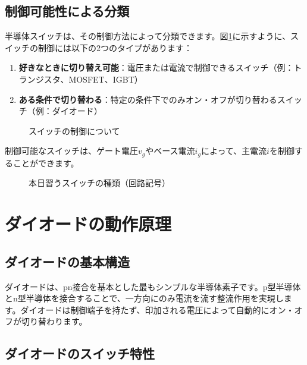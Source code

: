 \subsection{制御可能性による分類}

半導体スイッチは、その制御方法によって分類できます。図\ref{fig:control}に示すように、スイッチの制御には以下の2つのタイプがあります：

\begin{enumerate}
\item \textbf{好きなときに切り替え可能}：電圧または電流で制御できるスイッチ（例：トランジスタ、MOSFET、IGBT）
\item \textbf{ある条件で切り替わる}：特定の条件下でのみオン・オフが切り替わるスイッチ（例：ダイオード）
\end{enumerate}

\begin{figure}[H]
\centering
{}
\caption{スイッチの制御について}
\label{fig:control}
\end{figure}

制御可能なスイッチは、ゲート電圧$v_g$やベース電流$i_g$によって、主電流$i$を制御することができます。

\begin{figure}[H]
\centering
{}
\caption{本日習うスイッチの種類（回路記号）}
\label{fig:switch_symbols}
\end{figure}

\section{ダイオードの動作原理}

\subsection{ダイオードの基本構造}

ダイオードは、pn接合を基本とした最もシンプルな半導体素子です。p型半導体とn型半導体を接合することで、一方向にのみ電流を流す整流作用を実現します。ダイオードは制御端子を持たず、印加される電圧によって自動的にオン・オフが切り替わります。

\subsection{ダイオードのスイッチ特性}


